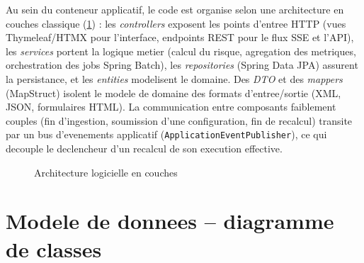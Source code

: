 Au sein du conteneur applicatif, le code est organise selon une architecture en
couches classique (\cref{fig:layers}) : les \emph{controllers} exposent les points
d'entree HTTP (vues Thymeleaf/HTMX pour l'interface, endpoints REST pour le flux SSE
et l'API), les \emph{services} portent la logique metier (calcul du risque,
agregation des metriques, orchestration des jobs Spring Batch), les
\emph{repositories} (Spring Data JPA) assurent la persistance, et les
\emph{entities} modelisent le domaine. Des \emph{DTO} et des \emph{mappers}
(MapStruct) isolent le modele de domaine des formats d'entree/sortie (XML, JSON,
formulaires HTML). La communication entre composants faiblement couples (fin
d'ingestion, soumission d'une configuration, fin de recalcul) transite par un bus
d'evenements applicatif (\texttt{ApplicationEventPublisher}), ce qui decouple le
declencheur d'un recalcul de son execution effective.

\begin{figure}[H]
\centering
{}
\caption{Architecture logicielle en couches}
\label{fig:layers}
\end{figure}

\section{Modele de donnees -- diagramme de classes}

